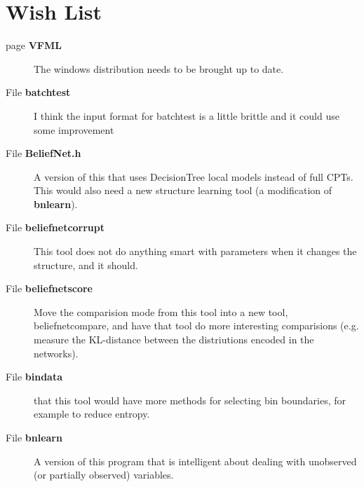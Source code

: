 \section{Wish List}\label{wish}
\label{_wish000001}
 \begin{description}
\item[page {\bf VFML} ]The windows distribution needs to be brought up to date. \end{description}


\label{_wish000015}
 \begin{description}
\item[File {\bf batchtest} ]I think the input format for batchtest is a little brittle and it could use some improvement \end{description}


\label{_wish000002}
 \begin{description}
\item[File {\bf Belief\-Net.h} ]A version of this that uses Decision\-Tree local models instead of full CPTs. This would also need a new structure learning tool (a modification of {\bf bnlearn}). \end{description}


\label{_wish000016}
 \begin{description}
\item[File {\bf beliefnetcorrupt} ]This tool does not do anything smart with parameters when it changes the structure, and it should. \end{description}


\label{_wish000017}
 \begin{description}
\item[File {\bf beliefnetscore} ]Move the comparision mode from this tool into a new tool, beliefnetcompare, and have that tool do more interesting comparisions (e.g. measure the KL-distance between the distriutions encoded in the networks). \end{description}


\label{_wish000018}
 \begin{description}
\item[File {\bf bindata} ]that this tool would have more methods for selecting bin boundaries, for example to reduce entropy. \end{description}


\label{_wish000008}
 \begin{description}
\item[File {\bf bnlearn} ]A version of this program that is intelligent about dealing with unobserved (or partially observed) variables. \end{description}


